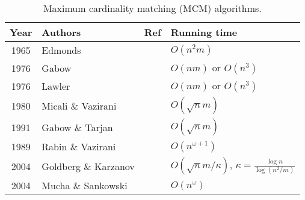 \begin{table}
\centering
\begin{tabular}{clcl}
\toprule
\textbf{Year} & \textbf{Authors} & \textbf{Ref}                 & \textbf{Running time} \\
\midrule
1965 & Edmonds                   &\cite{edmonds1965paths}       & $O(n^2m)$ \\
1976 & Gabow                     &\cite{gabow1976efficient}     & $O(nm)$ or $O(n^3)$ \\
1976 & Lawler                    &\cite{lawler2001combinatorial}& $O(nm)$ or $O(n^3)$ \\
1980 & Micali \& Vazirani        &\cite{micali1980v}            & $O(\sqrt{n}m)$ \\
1991 & Gabow \& Tarjan           &\cite{micali1980v}            & $O(\sqrt{n}m)$ \\
1989 & Rabin \& Vazirani         &\cite{rabin1989maximum}       & $O(n^{\omega + 1})$ \\
2004 & Goldberg \& Karzanov      &\cite{goldberg2004maximum}    & $O(\sqrt{n}m/\kappa)$, $\kappa = \frac{\log n}{\log(n^2/m)}$ \\
2004 & Mucha \& Sankowski        &\cite{mucha2004maximum}       & $O(n^\omega)$ \\
\bottomrule
\end{tabular}
\caption{Maximum cardinality matching (\textsc{MCM}) algorithms.}\label{tab:mcm_alogrithms}
\end{table}

